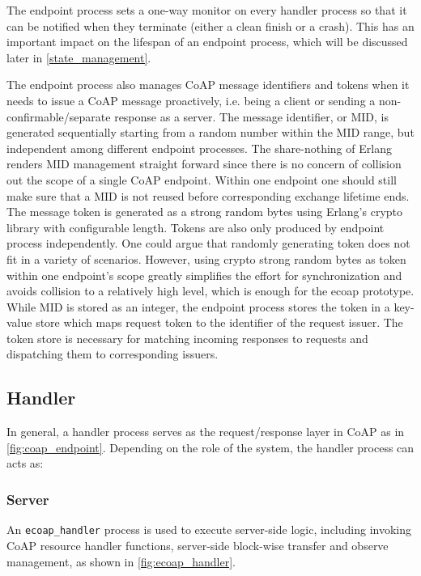 The endpoint process sets a one-way monitor on every handler process so that it can be notified when they terminate (either a clean finish or a crash). This has an important impact on the lifespan of an endpoint process, which will be discussed later in \autoref{state_management}. 

The endpoint process also manages CoAP message identifiers and tokens when it needs to issue a CoAP message proactively, i.e. being a client or sending a non-confirmable/separate response as a server. The message identifier, or MID, is generated sequentially starting from a random number within the MID range, but independent among different endpoint processes. The share-nothing of Erlang renders MID management straight forward since there is no concern of collision out the scope of a single CoAP endpoint. Within one endpoint one should still make sure that a MID is not reused before corresponding exchange lifetime ends. The message token is generated as a strong random bytes using Erlang's crypto library with configurable length. Tokens are also only produced by endpoint process independently. One could argue that randomly generating token does not fit in a variety of scenarios. However, using crypto strong random bytes as token within one endpoint's scope greatly simplifies the effort for synchronization and avoids collision to a relatively high level, which is enough for the ecoap prototype. While MID is stored as an integer, the endpoint process stores the token in a key-value store which maps request token to the identifier of the request issuer. The token store is necessary for matching incoming responses to requests and dispatching them to corresponding issuers.

\subsection{Handler}\label{coap_handler}

In general, a handler process serves as the request/response layer in CoAP as in \autoref{fig:coap_endpoint}. Depending on the role of the system, the handler process can acts as:

\subsubsection{Server}

An \verb|ecoap_handler| process is used to execute server-side logic, including invoking CoAP resource handler functions, server-side block-wise transfer and observe management, as shown in \autoref{fig:ecoap_handler}. 

